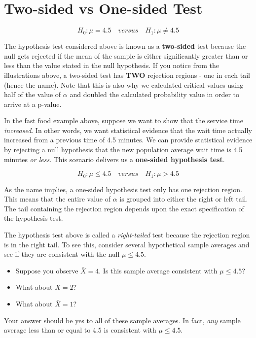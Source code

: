 \documentclass[
]{book}
\begin{document}
\hypertarget{two-sided-vs-one-sided-test}{%
\section{Two-sided vs One-sided Test}\label{two-sided-vs-one-sided-test}}

\[H_0:\mu=4.5 \quad versus \quad H_1:\mu\neq 4.5\]

The hypothesis test considered above is known as a \textbf{two-sided} test because the null gets rejected if the mean of the sample is either significantly greater than or less than the value stated in the null hypothesis. If you notice from the illustrations above, a two-sided test has \textbf{TWO} rejection regions - one in each tail (hence the name). Note that this is also why we calculated critical values using half of the value of \(\alpha\) and doubled the calculated probability value in order to arrive at a p-value.

In the fast food example above, suppose we want to show that the service time \emph{increased}. In other words, we want statistical evidence that the wait time actually increased from a previous time of 4.5 minutes. We can provide statistical evidence by rejecting a null hypothesis that the new population average wait time is 4.5 minutes \emph{or less}. This scenario delivers us a \textbf{one-sided hypothesis test}.

\[H_0:\mu \leq 4.5 \quad versus \quad H_1:\mu> 4.5\]

As the name implies, a one-sided hypothesis test only has one rejection region. This means that the entire value of \(\alpha\) is grouped into either the right or left tail. The tail containing the rejection region depends upon the exact specification of the hypothesis test.

The hypothesis test above is called a \emph{right-tailed} test because the rejection region is in the right tail. To see this, consider several hypothetical sample averages and see if they are consistent with the null \(\mu \leq 4.5\).

\begin{itemize}
\item
  Suppose you observe \(\bar{X}=4\). Is this sample average consistent with \(\mu \leq 4.5\)?
\item
  What about \(\bar{X}=2\)?
\item
  What about \(\bar{X}=1\)?
\end{itemize}

Your answer should be yes to all of these sample averages. In fact, \emph{any} sample average less than or equal to 4.5 is consistent with \(\mu \leq 4.5\).
\end{document}
